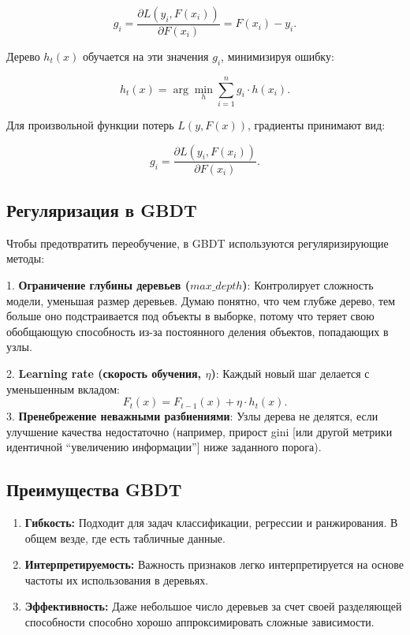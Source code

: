 \[
    g_i = \frac{\partial L(y_i, F(x_i))}{\partial F(x_i)} = F(x_i) - y_i.
\]

Дерево \(h_t(x)\) обучается на эти значения \(g_i\), минимизируя ошибку:

\[
    h_t(x) = \arg\min_{h} \sum_{i=1}^n g_i \cdot h(x_i).
\]

Для произвольной функции потерь \(L(y, F(x))\), градиенты принимают вид:

\[
    g_i = \frac{\partial L(y_i, F(x_i))}{\partial F(x_i)}.
\]

\subsection*{Регуляризация в GBDT}

Чтобы предотвратить переобучение, в GBDT используются регуляризирующие методы:

1. \textbf{Ограничение глубины деревьев (\(max\_depth\))}:
Контролирует сложность модели, уменьшая размер деревьев. Думаю понятно, что чем глубже дерево, тем больше оно подстраивается под объекты в выборке, потому что теряет свою обобщающую способность из-за постоянного деления объектов, попадающих в узлы.

2. \textbf{Learning rate (скорость обучения, \(\eta\))}:
Каждый новый шаг делается с уменьшенным вкладом:
\[
    F_t(x) = F_{t-1}(x) + \eta \cdot h_t(x).
\]
3. \textbf{Пренебрежение неважными разбиениями}:
Узлы дерева не делятся, если улучшение качества недостаточно (например, прирост gini [или другой метрики идентичной ``увеличению информации''] ниже заданного порога).


\subsection*{Преимущества GBDT}

\begin{enumerate}
    \item \textbf{Гибкость:}
          Подходит для задач классификации, регрессии и ранжирования. В общем везде, где есть табличные данные.

    \item \textbf{Интерпретируемость:}
          Важность признаков легко интерпретируется на основе частоты их использования в деревьях.

    \item \textbf{Эффективность:}
          Даже небольшое число деревьев за счет своей разделяющей способности способно хорошо аппроксимировать сложные зависимости.
\end{enumerate}


